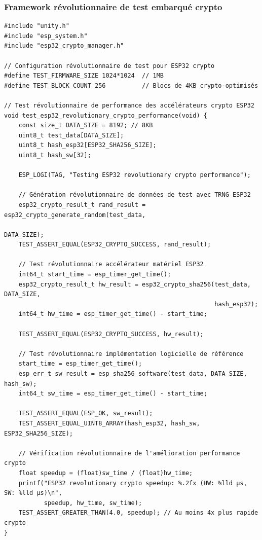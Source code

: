 \subsubsection{Framework révolutionnaire de test embarqué crypto}

\begin{lstlisting}[caption={Framework révolutionnaire de test embarqué ESP32 crypto}]
#include "unity.h"
#include "esp_system.h"
#include "esp32_crypto_manager.h"

// Configuration révolutionnaire de test pour ESP32 crypto
#define TEST_FIRMWARE_SIZE 1024*1024  // 1MB
#define TEST_BLOCK_COUNT 256          // Blocs de 4KB crypto-optimisés

// Test révolutionnaire de performance des accélérateurs crypto ESP32
void test_esp32_revolutionary_crypto_performance(void) {
    const size_t DATA_SIZE = 8192; // 8KB
    uint8_t test_data[DATA_SIZE];
    uint8_t hash_esp32[ESP32_SHA256_SIZE];
    uint8_t hash_sw[32];
    
    ESP_LOGI(TAG, "Testing ESP32 revolutionary crypto performance");
    
    // Génération révolutionnaire de données de test avec TRNG ESP32
    esp32_crypto_result_t rand_result = esp32_crypto_generate_random(test_data, 
                                                                     DATA_SIZE);
    TEST_ASSERT_EQUAL(ESP32_CRYPTO_SUCCESS, rand_result);
    
    // Test révolutionnaire accélérateur matériel ESP32
    int64_t start_time = esp_timer_get_time();
    esp32_crypto_result_t hw_result = esp32_crypto_sha256(test_data, DATA_SIZE, 
                                                          hash_esp32);
    int64_t hw_time = esp_timer_get_time() - start_time;
    
    TEST_ASSERT_EQUAL(ESP32_CRYPTO_SUCCESS, hw_result);
    
    // Test révolutionnaire implémentation logicielle de référence
    start_time = esp_timer_get_time();
    esp_err_t sw_result = esp_sha256_software(test_data, DATA_SIZE, hash_sw);
    int64_t sw_time = esp_timer_get_time() - start_time;
    
    TEST_ASSERT_EQUAL(ESP_OK, sw_result);
    TEST_ASSERT_EQUAL_UINT8_ARRAY(hash_esp32, hash_sw, ESP32_SHA256_SIZE);
    
    // Vérification révolutionnaire de l'amélioration performance crypto
    float speedup = (float)sw_time / (float)hw_time;
    printf("ESP32 revolutionary crypto speedup: %.2fx (HW: %lld µs, SW: %lld µs)\n", 
           speedup, hw_time, sw_time);
    TEST_ASSERT_GREATER_THAN(4.0, speedup); // Au moins 4x plus rapide crypto
}


\end{lstlisting}
